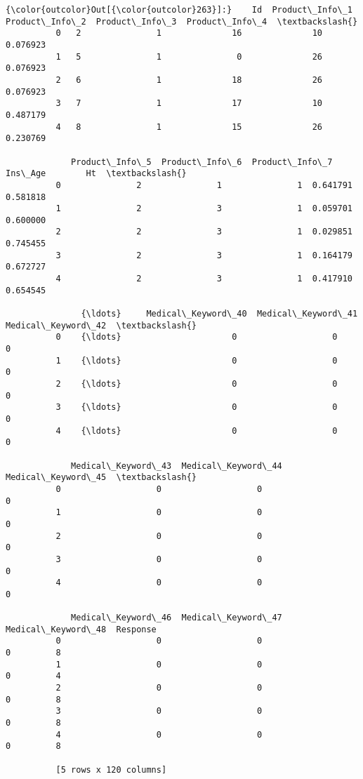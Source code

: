 \documentclass[11pt]{article}
\begin{document}
\begin{Verbatim}[commandchars=\\\{\}]
{\color{outcolor}Out[{\color{outcolor}263}]:}    Id  Product\_Info\_1  Product\_Info\_2  Product\_Info\_3  Product\_Info\_4  \textbackslash{}
          0   2               1              16              10        0.076923   
          1   5               1               0              26        0.076923   
          2   6               1              18              26        0.076923   
          3   7               1              17              10        0.487179   
          4   8               1              15              26        0.230769   
          
             Product\_Info\_5  Product\_Info\_6  Product\_Info\_7   Ins\_Age        Ht  \textbackslash{}
          0               2               1               1  0.641791  0.581818   
          1               2               3               1  0.059701  0.600000   
          2               2               3               1  0.029851  0.745455   
          3               2               3               1  0.164179  0.672727   
          4               2               3               1  0.417910  0.654545   
          
               {\ldots}     Medical\_Keyword\_40  Medical\_Keyword\_41  Medical\_Keyword\_42  \textbackslash{}
          0    {\ldots}                      0                   0                   0   
          1    {\ldots}                      0                   0                   0   
          2    {\ldots}                      0                   0                   0   
          3    {\ldots}                      0                   0                   0   
          4    {\ldots}                      0                   0                   0   
          
             Medical\_Keyword\_43  Medical\_Keyword\_44  Medical\_Keyword\_45  \textbackslash{}
          0                   0                   0                   0   
          1                   0                   0                   0   
          2                   0                   0                   0   
          3                   0                   0                   0   
          4                   0                   0                   0   
          
             Medical\_Keyword\_46  Medical\_Keyword\_47  Medical\_Keyword\_48  Response  
          0                   0                   0                   0         8  
          1                   0                   0                   0         4  
          2                   0                   0                   0         8  
          3                   0                   0                   0         8  
          4                   0                   0                   0         8  
          
          [5 rows x 120 columns]
\end{Verbatim}
            
\end{document}
